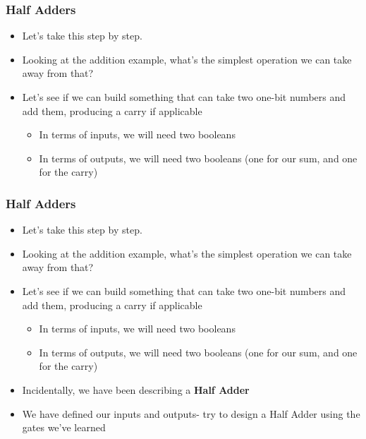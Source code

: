 \documentclass{beamer}
\begin{document}
		\begin{frame}
			\frametitle{Half Adders}
			\begin{itemize}
				\item Let's take this step by step.
				\item Looking at the addition example, what's the simplest operation we can take away from that?
				\item Let's see if we can build something that can take two one-bit numbers and add them, producing a carry if applicable
				\begin{itemize}
					\item In terms of inputs, we will need two booleans
					\item In terms of outputs, we will need two booleans (one for our sum, and one for the carry)
				\end{itemize}
				
			\end{itemize}
			
				
		\end{frame}
		
		
		\begin{frame}
			\frametitle{Half Adders}
			\begin{itemize}
				\item Let's take this step by step.
				\item Looking at the addition example, what's the simplest operation we can take away from that?
				\item Let's see if we can build something that can take two one-bit numbers and add them, producing a carry if applicable
				\begin{itemize}
					\item In terms of inputs, we will need two booleans
					\item In terms of outputs, we will need two booleans (one for our sum, and one for the carry)
				\end{itemize}
				\item Incidentally, we have been describing a \textbf{Half Adder}
				\item We have defined our inputs and outputs- try to design a Half Adder using the gates we've learned
			\end{itemize}
			
				
		\end{frame}
		
\end{document}

